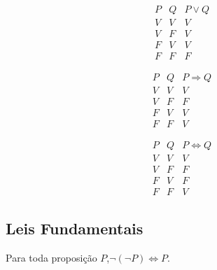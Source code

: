\documentclass[../../main]{subfiles}
\begin{document}
\begin{prop}
	\begin{equation*}
		\begin{array}{c|c|c}
			P & Q & P \lor Q \\
			\hline
			V & V & V        \\
			V & F & V        \\
			F & V & V        \\
			F & F & F
		\end{array}
	\end{equation*}
\end{prop}

\begin{prop}
	\begin{equation*}
		\begin{array}{c|c|c}
			P & Q & P \Rightarrow Q \\
			\hline
			V & V & V               \\
			V & F & F               \\
			F & V & V               \\
			F & F & V
		\end{array}
	\end{equation*}
\end{prop}

\begin{prop}
	\begin{equation*}
		\begin{array}{c|c|c}
			P & Q & P \Leftrightarrow Q \\
			\hline
			V & V & V                   \\
			V & F & F                   \\
			F & V & F                   \\
			F & F & V
		\end{array}
	\end{equation*}
\end{prop}

\newpage

\subsection{Leis Fundamentais}

\begin{prop}
	\label{prop:matematica:logica-matematica:logica-proposicional:dupla-negacao}

	Para toda proposição \(P\),\(\neg(\neg P) \Leftrightarrow P.\)
\end{prop}
\end{document}
